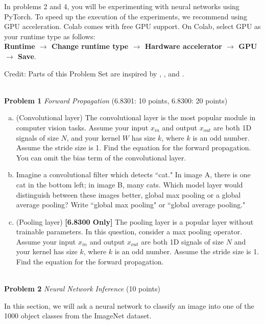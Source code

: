 \documentclass[11pt]{article}
\newcommand{\hwproblem}[2] {\noindent \\ {\bf #1} {\it #2}}
\begin{document}
In problems 2 and 4, you will be experimenting with neural networks using PyTorch. To speed up the execution of the experiments, we recommend using GPU acceleration. Colab comes with free GPU support. On Colab, select GPU as your runtime type as follows:\\
\textbf{Runtime $\rightarrow$ Change runtime type $\rightarrow$ Hardware accelerator $\rightarrow$ GPU $\rightarrow$ Save}.

Credit: Parts of this Problem Set are inspired by \cite{santurkar2019image}, \cite{engstrom2019adversarial}, and \cite{olah2017feature}.

\newpage 

\hwproblem{Problem 1}{Forward Propagation} (6.8301: 10 points, 6.8300: 20 points)
\vspace{-0.5em}
\begin{enumerate}[(a)]
  \item (Convolutional layer) The convolutional layer is the most popular module in computer vision tasks. Assume your input $x_{in}$ and output $x_{out}$ are both 1D signals of size $N$, and your kernel $W$ has size $k$, where $k$ is an odd number. Assume the stride size is 1. Find the equation for the forward propagation. You can omit the bias term of the convolutional layer.

  \item Imagine a convolutional filter which detects ``cat." In image A, there is one cat in the bottom left; in image B, many cats. Which model layer would distinguish between these images better, global max pooling or a global average pooling? Write ``global max pooling" or ``global average pooling."
  
  \item (Pooling layer) \textbf{[6.8300 Only]} The pooling layer is a popular layer without trainable parameters. In this question, consider a max pooling operator. Assume your input $x_{in}$ and output $x_{out}$ are both 1D signals of size $N$ and your kernel has size $k$, where $k$ is an odd number. Assume the stride size is 1. Find the equation for the forward propagation.
\end{enumerate}


\hwproblem{Problem 2}{Neural Network Inference} (10 points)

\vspace{-0.2em}

In this section, we will ask a neural network to classify an image into one of the 1000 object classes from the ImageNet dataset.
\end{document}
